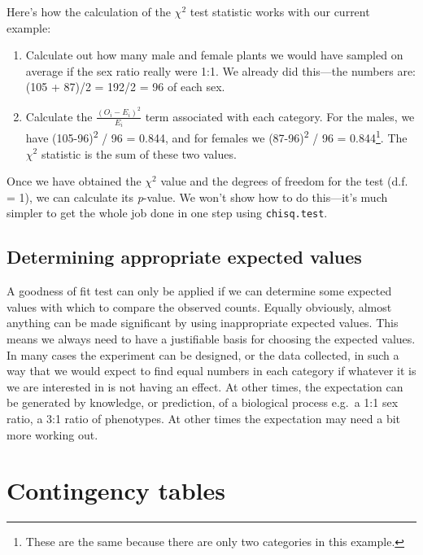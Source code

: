 \documentclass[
]{book}
\providecommand{\tightlist}{%
  \setlength{\itemsep}{0pt}\setlength{\parskip}{0pt}}
\begin{document}
Here's how the calculation of the \(\chi^{2}\) test statistic works with our current example:

\begin{enumerate}
\def\labelenumi{\arabic{enumi}.}
\tightlist
\item
  Calculate out how many male and female plants we would have sampled on average if the sex ratio really were 1:1. We already did this---the numbers are: (105 + 87)/2 = 192/2 = 96 of each sex.
\item
  Calculate the \(\frac{(O_i-E_i)^2}{E_i}\) term associated with each category. For the males, we have (105-96)\textsuperscript{2} / 96 = 0.844, and for females we (87-96)\textsuperscript{2} / 96 = 0.844\footnote{These are the same because there are only two categories in this example.}. The \(\chi^{2}\) statistic is the sum of these two values.
\end{enumerate}

Once we have obtained the \(\chi^{2}\) value and the degrees of freedom for the test (d.f. = 1), we can calculate its \emph{p}-value. We won't show how to do this---it's much simpler to get the whole job done in one step using \texttt{chisq.test}.

\hypertarget{determining-appropriate-expected-values}{%
\section{Determining appropriate expected values}\label{determining-appropriate-expected-values}}

A goodness of fit test can only be applied if we can determine some expected values with which to compare the observed counts. Equally obviously, almost anything can be made significant by using inappropriate expected values. This means we always need to have a justifiable basis for choosing the expected values. In many cases the experiment can be designed, or the data collected, in such a way that we would expect to find equal numbers in each category if whatever it is we are interested in is not having an effect. At other times, the expectation can be generated by knowledge, or prediction, of a biological process e.g.~a 1:1 sex ratio, a 3:1 ratio of phenotypes. At other times the expectation may need a bit more working out.

\hypertarget{contingency-tables}{%
\chapter{Contingency tables}\label{contingency-tables}}
\end{document}

